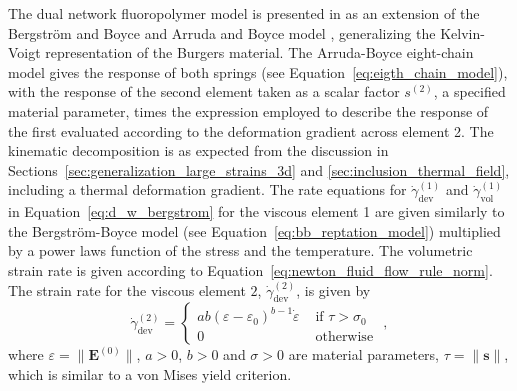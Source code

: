 The dual network fluoropolymer model is presented in \cite{bergstromConstitutiveModelPredicting2005} as an extension of the Bergström and Boyce \citep{bergstromConstitutiveModelingLarge1998} and Arruda and Boyce model \citep{arrudaEffectsStrainRate1995}, generalizing the Kelvin-Voigt representation of the Burgers material.
The Arruda-Boyce eight-chain model gives the response of both springs (see Equation~\eqref{eq:eigth_chain_model}), with the response of the second element taken as a scalar factor $s^{(2)}$, a specified material parameter, times the expression employed to describe the response of the first evaluated according to the deformation gradient across element 2.
The kinematic decomposition is as expected from the discussion in Sections~\ref{sec:generalization_large_strains_3d} and \ref{sec:inclusion_thermal_field}, including a thermal deformation gradient.
The rate equations for $\dot\gamma^{(1)}_\text{dev}$ and $\dot\gamma^{(1)}_\text{vol}$ in Equation~\eqref{eq:d_w_bergstrom} for the viscous element 1 are given similarly to the Bergström-Boyce model (see Equation~\eqref{eq:bb_reptation_model}) multiplied by a power laws function of the stress and the temperature.
The volumetric strain rate is given according to Equation~\eqref{eq:newton_fluid_flow_rule_norm}.
The strain rate for the viscous element $2$, $\dot \gamma^{(2)}_\text{dev}$, is given by
\begin{equation}
	\dot{\gamma}_\text{dev}^{(2)}=\begin{cases}
	a b\left(\varepsilon-\varepsilon_0\right)^{b-1} \dot{\varepsilon} & \text { if } \tau>\sigma_0 \\
	0 & \text { otherwise }
	\end{cases},
\end{equation}
where $\varepsilon = \|\bm E^{(0)}\|$, $a >0$, $b>0$ and $\sigma>0$ are material parameters, $\tau = \|\bm s\|$, which is similar to a von Mises yield criterion.

